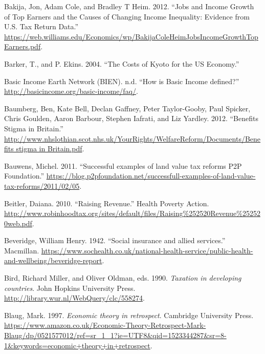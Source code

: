 \documentclass[]{tufte-handout}
\begin{document}
\leavevmode\hypertarget{ref-Bakija2012}{}%
Bakija, Jon, Adam Cole, and Bradley T Heim. 2012. ``Jobs and Income
Growth of Top Earners and the Causes of Changing Income Inequality:
Evidence from U.S. Tax Return Data.''
\url{https://web.williams.edu/Economics/wp/BakijaColeHeimJobsIncomeGrowthTopEarners.pdf}.

\leavevmode\hypertarget{ref-Barker2004}{}%
Barker, T., and P. Ekins. 2004. ``The Costs of Kyoto for the US
Economy.''

\leavevmode\hypertarget{ref-BasicIncomeEarthNetworkBIEN}{}%
Basic Income Earth Network (BIEN). n.d. ``How is Basic Income defined?''
\url{http://basicincome.org/basic-income/faq/}.

\leavevmode\hypertarget{ref-Baumberg2012}{}%
Baumberg, Ben, Kate Bell, Declan Gaffney, Peter Taylor-Gooby, Paul
Spicker, Chris Goulden, Aaron Barbour, Stephen Iafrati, and Liz Yardley.
2012. ``Benefits Stigma in Britain.''
\href{http://www.nhslothian.scot.nhs.uk/YourRights/WelfareReform/Documents/Benefits\%20stigma\%20in\%20Britain.pdf}{http://www.nhslothian.scot.nhs.uk/YourRights/WelfareReform/Documents/Benefits stigma in Britain.pdf}.

\leavevmode\hypertarget{ref-Bauwens2011}{}%
Bauwens, Michel. 2011. ``Successful examples of land value tax reforms
\textbar{} P2P Foundation.''
\url{https://blog.p2pfoundation.net/successfull-examples-of-land-value-tax-reforms/2011/02/05}.

\leavevmode\hypertarget{ref-Beitler2010}{}%
Beitler, Daiana. 2010. ``Raising Revenue.'' Health Poverty Action.
\url{http://www.robinhoodtax.org/sites/default/files/Raising\%252520Revenue\%252520web.pdf}.

\leavevmode\hypertarget{ref-Beveridge1942}{}%
Beveridge, William Henry. 1942. ``Social insurance and allied
services.'' Macmillan.
\url{https://www.sochealth.co.uk/national-health-service/public-health-and-wellbeing/beveridge-report}.

\leavevmode\hypertarget{ref-BirdAndOldman}{}%
Bird, Richard Miller, and Oliver Oldman, eds. 1990. \emph{Taxation in
developing countries}. John Hopkins University Press.
\url{http://library.wur.nl/WebQuery/clc/558274}.

\leavevmode\hypertarget{ref-blaug1997economic}{}%
Blaug, Mark. 1997. \emph{Economic theory in retrospect}. Cambridge
University Press.
\url{https://www.amazon.co.uk/Economic-Theory-Retrospect-Mark-Blaug/dp/0521577012/ref=sr_1_1?ie=UTF8\&qid=1523344287\&sr=8-1\&keywords=economic+theory+in+retrospect}.
\end{document}

